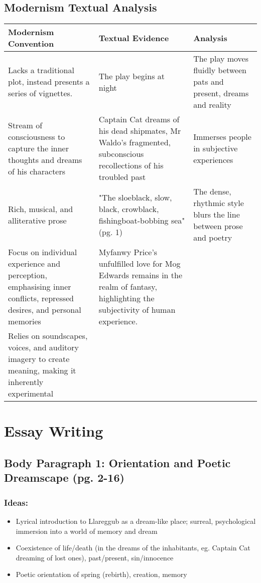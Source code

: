 	\subsection{Modernism Textual Analysis}

		\begin{table}[H]
			\centering
			\begin{tabular}{p{5cm}|p{5cm}|p{5cm}}
				\textbf{Modernism Convention} & \textbf{Textual Evidence} & \textbf{Analysis} \\ \hline
				Lacks a traditional plot, instead presents a series of vignettes. & The play begins at night & The play moves fluidly between pats and present, dreams and reality \\
				Stream of consciousness to capture the inner thoughts and dreams of his characters & Captain Cat dreams of his dead shipmates, Mr Waldo's fragmented, subconscious recollections of his troubled past & Immerses people in subjective experiences \\
				Rich, musical, and alliterative prose & "The sloeblack, slow, black, crowblack, fishingboat-bobbing sea" (pg. 1) & The dense, rhythmic style blurs the line between prose and poetry \\
				Focus on individual experience and perception, emphasising inner conflicts, repressed desires, and personal memories & Myfanwy Price's unfulfilled love for Mog Edwards remains in the realm of fantasy, highlighting the subjectivity of human experience. & \\
				Relies on soundscapes, voices, and auditory imagery to create meaning, making it inherently experimental & & 
			\end{tabular}
		\end{table}

\section{Essay Writing}

	\subsection{Body Paragraph 1: Orientation and Poetic Dreamscape (pg. 2-16)}

		\subsubsection{Ideas:} 
			
			\begin{itemize}
				\item Lyrical introduction to Llareggub as a dream-like place; surreal, psychological immersion into a world of memory and dream
				\item Coexistence of life/death (in the dreams of the inhabitants, eg. Captain Cat dreaming of lost ones), past/present, sin/innocence
				\item Poetic orientation of spring (rebirth), creation, memory
			\end{itemize}

